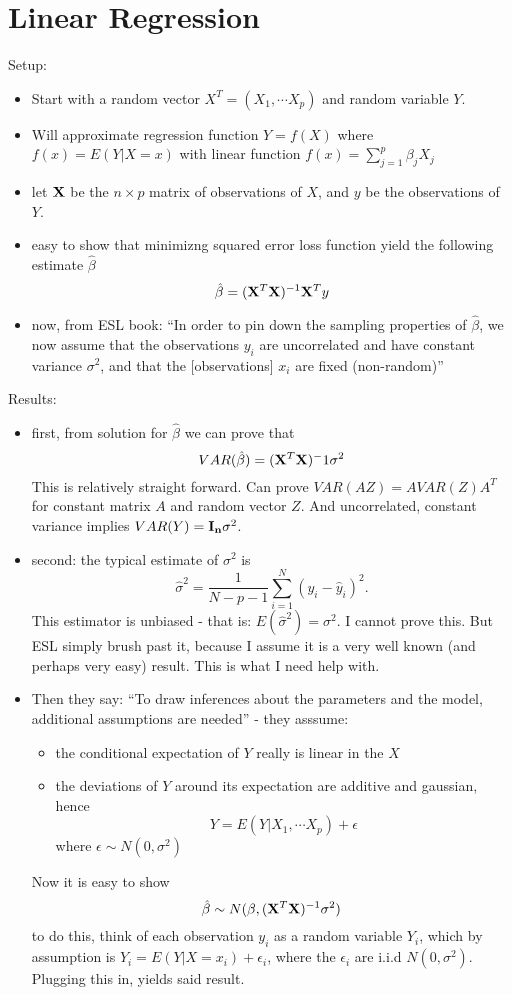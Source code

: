 \documentclass[a4paper]{article}
\newcommand{\red}{\color{red}}
\newcommand{\<}{\textless}
\renewcommand{\>}{\textgreater}
\begin{document}
\section{Linear Regression}
Setup:
\begin{itemize}
  \item Start with a random vector $X^T = (X_1, \cdots X_p)$ and random variable $Y$.
  \item Will approximate regression function $Y = f(X)$ where $f(x) = E(Y|X=x)$ with linear function  $f(x) = \sum_{j=1}^p \beta_j X_j$
  \item let ${\bf X}$ be the $n\times p$ matrix of observations of $X$, and $y$ be the observations of $Y$. 
  \item easy to show that minimizng squared error loss function yield the following estimate $\hat{\beta}$ 
    $$ \hat{\beta} = ({\bf X}^T {\bf X})^{-1} {\bf X}^T y $$
  \item now, from ESL book: ``In order to pin down the sampling properties of $\hat{\beta}$, we now assume that the observations $y_i$ are uncorrelated and have constant variance $\sigma^2$, and that the [observations] $x_i$ are fixed (non-random)''
\end{itemize}

Results:
\begin{itemize}
  \item first, from solution for ${\hat{\beta}}$ we can prove that
    $$ VAR(\hat{\beta})  = ({\bf X}^T{\bf X}){^-1} \sigma^2 $$
  	\subitem This is relatively straight forward. Can prove $VAR(AZ) = A VAR(Z) A^T$ for constant matrix $A$ and random vector $Z$. And uncorrelated, constant variance implies $VAR(Y) = {\bf I_n} \sigma^2$.
   \item second: the typical estimate of $\sigma^2$ is
     $$ \hat{\sigma}^2 = \frac{1}{N - p - 1} \sum_{i=1}^N (y_i - \hat{y}_i)^2. $$
     This estimator is unbiased - that is: $E(\hat{\sigma}^2) = \sigma^2$.
     \subitem I cannot prove this. But ESL simply brush past it, because I assume it is a very well known (and perhaps very easy) result.  {\red This is what I need help with.}
   \item Then they say: ``To draw inferences about the parameters and the model, additional assumptions are needed'' - they asssume:
     \begin{itemize}
       \item the conditional expectation of $Y$ really is linear in the $X$
       \item the deviations of $Y$ around its expectation are additive and gaussian, hence
	 \begin{equation}
	   Y = E(Y|X_1, \cdots X_p) + \epsilon 
	 \end{equation}
	 where $\epsilon \sim N(0, \sigma^2)$
     \end{itemize}
     Now it is easy to show 
     $$ \hat{\beta} \sim N(\beta, ({\bf X}^T {\bf X})^{-1} \sigma^2) $$
     \subitem to do this, think of each observation $y_i$ as a random variable $Y_i$, which by assumption is $Y_i = E(Y|X=x_i) + \epsilon_i$, where the $\epsilon_i$ are i.i.d $N(0,\sigma^2)$. Plugging this in, yields said result. 
\end{itemize}
\end{document}

